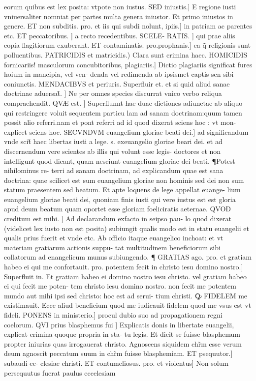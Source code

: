 \documentclass{article}
\begin{document}
\begin{pages}
eorum quibus est lex posita: vtpote non iustus. SED iniustis.] E regione iusti vniuersaliter  nomniat per partes multa genera iniustor. Et primo iniustos in genere. ET non subditis. pro. et iis qui subdi nolunt, ipiis.] in patriam ac parentes etc.  ET peccatoribus. ] a recto recedentibus. SCELE- RATIS. ] qui prae aliis copia flagitiorum exuberant. ET contaminatis. pro.prophanis.] ea q̃ religionis sunt polluentibus. PATRICIDIS et matricidis.) Clara sunt crimina haec. HOMICIDIS  fornicariis! masculorum concubitoribus, plagiariis.] Dictio plagiariis significat fures hoium in mancipia, vel ven- denda vel redimenda ab ipsismet captis sen sibi coniunctis. MENDACIBVS et periuris. Superfluir et. et si quid aliud sanae doctrinae aduersat̃. ] Ne per omnes species discurrat  vnico verbo reliqua compraehendit. QVÆ est. ] Superflunnt hae duae dictiones adiunctae ab aliquo qui restringere voluit sequentem particu lam ad sanam doctrinam:quum tamen possit alio referri.nam et pont referri ad id quod dixerat  sciens hoc : vt mon- explicet sciens hoc. SECVNDVM euangelium gloriae beati dei.]  ad significandum vnde scit̃ haec libertas iusti a lege. s. exeuangelio gloriae beari dei. et ad discernendum vere scientes ab illis qui volunt esse legis- doctores et non intelligunt quod  dicant, quam nesciunt euangelium gloriae dei beati. ¶Potest nihilominus re- terri ad sanam doctrinam, ad explicandum quae est sana doctrina: quae scilicet est sum euangelium gloriae non hominis sed dei  non sum statum praesentem sed beatum. Et apte loquens de lege  appellat euange- lium euangelium gloriae beati dei, quoniam finis iusti qui vere iustus est  est gloria apud deum beatum quam oportet esse gloriam foeliciratis aeternae. QVOD creditum est mihi. ] Ad declarandum exfacto in seipso pau- lo quod dixerat (videlicet lex iusto non est posita) subiungit qualis modo est in statu euangelii et qualis prius fuerit  et vnde etc.  Ab officio itaque  euangelico inchoat: et vt materiam gratiarum actionis suppu- tat multitudinem beneficiorum sibi collatorum ad enangelicum munus  subiungendo. ¶ GRATIAS ago. pro. et gratiam habeo  ei qui me confortauit. pro. potentem fecit  in christo iesu domino nostro.] Superfluit in. Et gratiam habeo ei domino nostro iesu christo. vel gratiam habeo ei  qui fecit me poten- tem christo iesu domino nostro. non fecit me potentem mundo aut mihi ipsi sed christo: hoc est ad serui- tium christi. Ꝙ FIDELEM me existimauit. Ecce aliud beneficium quod me iudicauit fidelem  quod me vsus est vt fideli. PONENS in ministerio.] procul dubio suo ad propagationem regni coelorum. QVI prius blasphemus fui ] Explicatis donis in libertate euangelii, explicat crimina quoque  propria in sta- tu legis. Et dicit se fuisse blasphemum  propter iniurias quas irrogauerat christo. Agnoscens siquidem chr̃m esse verum deum  agnoscit peccatum suum in chr̃m fuisse blasphemiam. ET psequutor.] subaudi ec- clesiae christi. ET contumeliosus. pro. et violentus] Non solum persequutus fuerat paulus eccelesiam  \pend

\end{pages}
\end{document}
